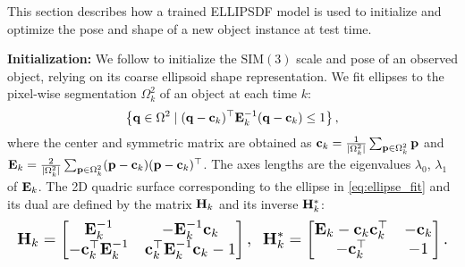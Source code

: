 This section describes how a trained ELLIPSDF model is used to initialize and optimize the pose and shape of a new object instance at test time.



{\vspace{1ex}\bf \noindent Initialization: }%
We follow \cite{crocco2016structure, rubino20173d, gay2018visual} to initialize the $\text{SIM}(3)$ scale and pose of an observed object, relying on its coarse ellipsoid shape representation. We fit ellipses to the pixel-wise segmentation $\Omega_k^2$ of an object at each time $k$:
%
\begin{equation} \label{eq:ellipse_fit}
    \left\{ \mathbf{q} \in \Omega^2 \mid (\mathbf{q} - \mathbf{c}_k)^\top \mathbf{E}_k^{-1} (\mathbf{q} - \mathbf{c}_k) \leq 1\right\},
\end{equation}
%
where the center and symmetric matrix are obtained as $\mathbf{c}_k = \frac{1}{|\Omega_k^2|}\sum_{\mathbf{p} \in \Omega_k^2} \mathbf{p}$ and $\mathbf{E}_k = \frac{2}{|\Omega_k^2|}\sum_{\mathbf{p} \in \Omega_k^2} (\mathbf{p}-\mathbf{c}_k)(\mathbf{p}-\mathbf{c}_k)^\top$. The axes lengths are the eigenvalues $\lambda_{0}$, $\lambda_{1}$ of $\mathbf{E}_k$. The 2D quadric surface corresponding to the ellipse in \eqref{eq:ellipse_fit} and its dual are defined by the matrix $\mathbf{H}_k$ and its inverse $\mathbf{H}_k^*$:
%
\begin{equation*}
    \scaleMathLine{\bfH_k = \begin{bmatrix} \bfE_k^{-1} & -\bfE_k^{-1}\bfc_k \\ -\bfc_k^\top \bfE_k^{-1} & \bfc_k^\top \bfE_k^{-1} \bfc_k - 1\end{bmatrix}, \;\; \bfH_k^* = \begin{bmatrix}\bfE_k - \bfc_k\bfc_k^\top & -\bfc_k \\ -\bfc_k^\top & -1\end{bmatrix}.}
\end{equation*}






